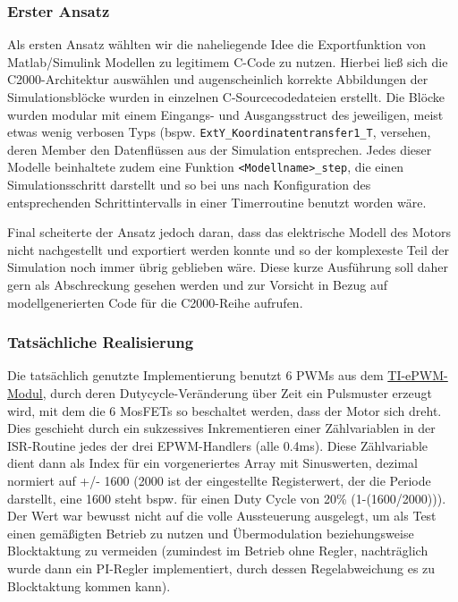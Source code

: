\subsubsection{Erster Ansatz}
Als ersten Ansatz wählten wir die naheliegende Idee die Exportfunktion von Matlab/Simulink Modellen zu legitimem C-Code zu nutzen. Hierbei ließ sich die C2000-Architektur auswählen und augenscheinlich korrekte Abbildungen der Simulationsblöcke wurden in einzelnen C-Sourcecodedateien erstellt. Die Blöcke wurden modular mit einem Eingangs- und Ausgangsstruct des jeweiligen, meist etwas wenig verbosen Typs (bspw. {\lstinline[breaklines=true]$ExtY_Koordinatentransfer1_T$}, versehen, deren Member den Datenflüssen aus der Simulation entsprechen. Jedes dieser Modelle beinhaltete zudem eine Funktion {\lstinline[breaklines=true]$<Modellname>_step$}, die einen Simulationsschritt darstellt und so bei uns nach Konfiguration des entsprechenden Schrittintervalls in einer Timerroutine benutzt worden wäre.\\\par

Final scheiterte der Ansatz jedoch daran, dass das elektrische Modell des Motors nicht nachgestellt und exportiert werden konnte und so der komplexeste Teil der Simulation noch immer übrig geblieben wäre. Diese kurze Ausführung soll daher gern als Abschreckung gesehen werden und zur Vorsicht in Bezug auf modellgenerierten Code für die C2000-Reihe aufrufen.

\subsubsection{Tatsächliche Realisierung}
Die tatsächlich genutzte Implementierung benutzt 6 PWMs aus dem \href{http://www.ti.com/lit/ug/spruge9e/spruge9e.pdf}{TI-ePWM-Modul}, durch deren Dutycycle-Veränderung über Zeit ein Pulsmuster erzeugt wird, mit dem die 6 MosFETs so beschaltet werden, dass der Motor sich dreht. Dies geschieht durch ein sukzessives Inkrementieren einer Zählvariablen in der ISR-Routine jedes der drei EPWM-Handlers (alle 0.4ms). Diese Zählvariable dient dann als Index für ein vorgeneriertes Array mit Sinuswerten, dezimal normiert auf +/- 1600 (2000 ist der eingestellte Registerwert, der die Periode darstellt, eine 1600 steht bspw. für einen Duty Cycle von 20\% (1-(1600/2000))). Der Wert war bewusst nicht auf die volle Aussteuerung ausgelegt, um als Test einen gemäßigten Betrieb zu nutzen und Übermodulation beziehungsweise Blocktaktung zu vermeiden (zumindest im Betrieb ohne Regler, nachträglich wurde dann ein PI-Regler implementiert, durch dessen Regelabweichung es zu Blocktaktung kommen kann).\\\par

